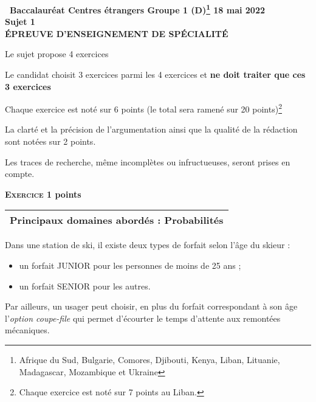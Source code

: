 \documentclass[11pt,a4paper,french]{article}
\begin{document}
\setlength\parindent{0mm}
\pagestyle{fancy}
\thispagestyle{empty}

\begin{center}{\Large\textbf{\decofourleft~Baccalauréat Centres étrangers Groupe 1  (D)\footnote{Afrique du Sud, Bulgarie, Comores, Djibouti, Kenya, Liban, Lituanie, Madagascar, Mozambique et Ukraine} 18 mai 2022~\decofourright\\[7pt]  Sujet 1\\[7pt] ÉPREUVE D'ENSEIGNEMENT DE SPÉCIALITÉ}}
\end{center}

\vspace{0,25cm}

Le sujet propose 4 exercices

Le candidat choisit 3 exercices parmi les 4 exercices et \textbf{ne doit traiter que ces 3 exercices}

Chaque exercice est noté sur 6 points (le total sera ramené sur 20 points)\footnote{Chaque exercice est noté sur 7 points au Liban.}

La clarté et la précision de l'argumentation ainsi que la qualité de la rédaction sont notées sur 2 points.

Les traces de recherche, même incomplètes ou infructueuses, seront prises en compte.

\bigskip

\textbf{\textsc{Exercice 1}  points\hfill }

\medskip

\begin{tabularx}{\linewidth}{|X|}\hline
\textbf{Principaux domaines abordés :} Probabilités\\ \hline
\end{tabularx}

\medskip

Dans une station de ski, il existe deux types de forfait selon l'âge du skieur :

\begin{itemize}
\item un forfait JUNIOR pour les personnes de moins de 25 ans ;
\item un forfait SENIOR pour les autres.
\end{itemize}

 Par ailleurs, un usager peut choisir, en plus du forfait correspondant à son âge l'\emph{option  coupe-file} qui permet d'écourter le temps d'attente aux remontées mécaniques.
\end{document}
